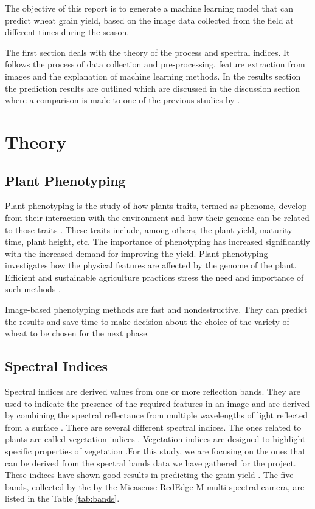 \documentclass[sigconf, nonacm, natbib, screen, balance=False]{acmart}
\begin{document}
The objective of this report is to generate a machine learning model that can predict wheat grain yield, based on the image data collected from the field at different times during the season.

The first section deals with the theory of the process and spectral indices. It follows the process of data collection and pre-processing, feature extraction from images and the explanation of machine learning methods. In the results section the prediction results are outlined which are discussed in the discussion section where a comparison is made to one of the previous studies by \citet{lied}.

\section{Theory}\label{sec:theory}

\subsection{Plant Phenotyping}\label{sec:plant_pheno}

Plant phenotyping is the study of how plants traits, termed as phenome, develop from their interaction with the environment and how their genome can be related to those traits \citep{minervini}. These traits include, among others, the plant yield, maturity time, plant height, etc. The importance of phenotyping has increased significantly with the increased demand for improving the yield.
Plant phenotyping investigates how the physical features are affected by the genome of the plant. Efficient and sustainable agriculture practices stress the need and importance of such methods \citep{Minervini13}.

Image-based phenotyping methods are fast and nondestructive. They can predict the results and save time to make decision about the choice of the variety of wheat to be chosen for the next phase.

\subsection{Spectral Indices}\label{sec:indices}

Spectral indices are derived values from one or more reflection bands. They are used to indicate the presence of the required features in an image and are derived by combining the spectral reflectance from multiple wavelengths of light reflected from a surface \citep{indices:online}. There are several different spectral indices. The ones related to plants are called vegetation indices \citep{huete}. Vegetation indices are designed to highlight specific properties of vegetation \citep{veg_indices:online}.For this study, we are focusing on the ones that can be derived from the spectral bands data we have gathered for the project. These indices have shown good results in predicting the grain yield \citep{Zhang2014}. The five bands, collected by the by the Micasense RedEdge-M multi-spectral camera, are listed in the Table \ref{tab:bands}.
\end{document}
